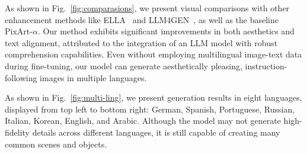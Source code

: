 As shown in Fig.~\ref{fig:comparasions}, we present visual comparisons with other enhancement methods like ELLA~\cite{hu2024ella} and LLM4GEN~\cite{liu2024llm4genleveragingsemanticrepresentation}, as well as the baseline PixArt-$\alpha$. Our method exhibits significant improvements in both aesthetics and text alignment, attributed to the integration of an LLM model with robust comprehension capabilities. Even without employing multilingual image-text data during fine-tuning, our model can generate aesthetically pleasing, instruction-following images in multiple languages.

As shown in Fig.~\ref{fig:multi-ling}, we present generation results in eight languages, displayed from top left to bottom right: German, Spanish, Portuguese, Russian, Italian, Korean, English, and Arabic. Although the model may not generate high-fidelity details across different languages, it is still capable of creating many common scenes and objects.


